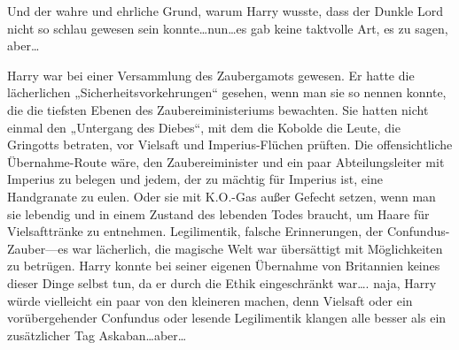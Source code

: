 Und der wahre und ehrliche Grund, warum Harry wusste, dass der Dunkle Lord nicht so schlau gewesen sein konnte…nun…es gab keine taktvolle Art, es zu sagen, aber…

Harry war bei einer Versammlung des Zaubergamots gewesen. Er hatte die lächerlichen „Sicherheitsvorkehrungen“ gesehen, wenn man sie so nennen konnte, die die tiefsten Ebenen des Zaubereiministeriums bewachten. Sie hatten nicht einmal den „Untergang des Diebes“, mit dem die Kobolde die Leute, die Gringotts betraten, vor Vielsaft und Imperius-Flüchen prüften. Die offensichtliche Übernahme-Route wäre, den Zaubereiminister und ein paar Abteilungsleiter mit Imperius zu belegen und jedem, der zu mächtig für Imperius ist, eine Handgranate zu eulen. Oder sie mit K.O.-Gas außer Gefecht setzen, wenn man sie lebendig und in einem Zustand des lebenden Todes braucht, um Haare für Vielsafttränke zu entnehmen. Legilimentik, falsche Erinnerungen, der Confundus-Zauber—es war lächerlich, die magische Welt war übersättigt mit Möglichkeiten zu betrügen. Harry konnte bei seiner eigenen Übernahme von Britannien keines dieser Dinge selbst tun, da er durch die Ethik eingeschränkt war…. naja, Harry würde vielleicht ein paar von den kleineren machen, denn Vielsaft oder ein vorübergehender Confundus oder lesende Legilimentik klangen alle besser als ein zusätzlicher Tag Askaban…aber…

